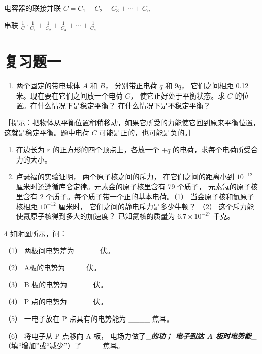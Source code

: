 电容器的联接并联 \(C = C_{1} + C_{2} + C_{3} + \cdots + C_{n}\)

串联
\(\frac{1}{C} \cdot \frac{1}{C_1} + \frac{1}{C_2} + \frac{1}{C_3} + \cdots + \frac{1}{C_n}\)

\section{复习题一}\label{ux590dux4e60ux9898ux4e00}

\begin{enumerate}
\def\labelenumi{\arabic{enumi}.}
\tightlist
\item
  两个固定的带电球体 \(A\) 和 \(B\)， 分别带正电荷 \(q\) 和 \(9q\)，
  它们之间相距 0.12 米。现在要在它们之间放一个电荷 \(C\)，
  使它正好处于平衡状态。求 \(C\) 的位置。在什么情况下是稳定平衡？
  在什么情况下是不稳定平衡？
\end{enumerate}

［提示：把物体从平衡位置稍稍移动，如果它所受的力能使它回到原来平衡位置，这就是稳定平衡。题中电荷
\(C\) 可能是正的，也可能是负的。］

\begin{enumerate}
\def\labelenumi{\arabic{enumi}.}
\setcounter{enumi}{1}
\item
  在边长为 \(r\) 的正方形的四个顶点上，各放一个 \(+q\)
  的电荷，求每个电荷所受合力的大小。
\item
  卢瑟福的实验证明， 两个原子核之间的斥力， 在它们之间的距离小到
  \(10^{-12}\) 厘米时还遵循库仑定律。元素金的原子核里含有 79 个质子，
  元素氖的原子核里含有 2 个质子。每个质子带一个正的基本电荷。（1）
  当金原子核和氦原子核相距 \(10^{-12}\) 厘米时，
  它们之间的静电斥力是多少牛顿？ （2）
  这个斥力能使氦原子核得到多大的加速度？ 已知氦核的质量为
  \(6.7 \times 10^{-27}\) 千克。
\end{enumerate}

4 如附图所示，问：

（1） 两板间电势差为 \_\_\_\_ 伏。

（2） A板的电势为\_\_\_\_伏。

（3） B 板的电势为 \_\_\_\_ 伏。

（4） P 点的电势为 \_\_\_\_ 伏。

（5） 一电子放在 P 点具有的电势能为 \_\_\_\_ 焦耳。

（6） 将电子从 P 点移向 A 板， 电场力做了\_\textbf{\emph{的功； 电子到达
A 板时电势能}}\_（填``增加''或``减少''）了\_\_\_\_焦耳。

